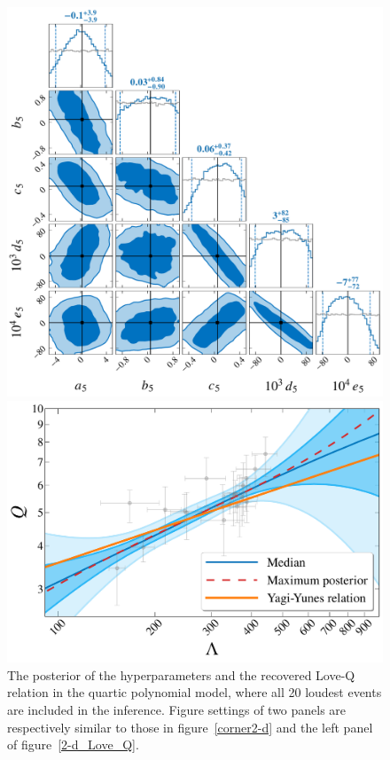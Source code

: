 \documentclass[a4paper,11pt]{article}
\begin{document}
\begin{figure}
\begin{minipage}[t]{0.49\textwidth}
\centering
\includegraphics[width=0.8\linewidth]{fig_hyper_parameter_5d.pdf}
\end{minipage}
\hfill
\begin{minipage}[t]{0.49\textwidth}
\includegraphics[width=\linewidth]{fig_hierarchical_results_5d.pdf}
\end{minipage}
    \caption{The posterior of the hyperparameters and the recovered Love-Q
    relation in the quartic polynomial model, where all 20 loudest events are
    included in the inference. Figure settings of two panels are respectively
    similar to those in figure~\ref{corner2-d} and the left panel of
    figure~\ref{2-d_Love_Q}. 
    } \label{5-d_Love_Q} 
\end{figure}
\end{document}
